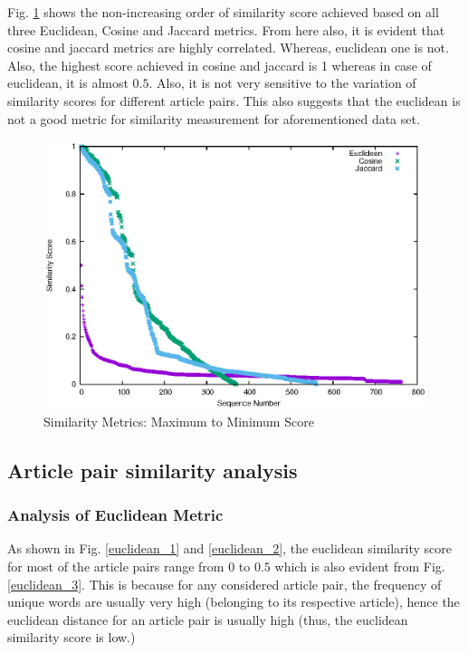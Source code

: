 \documentclass[journal,onecolumn]{IEEEtran}
\begin{document}
 Fig. \ref{usecase1} shows the non-increasing order of similarity score achieved based on all three Euclidean, Cosine and Jaccard metrics. From here also, it is evident that cosine and jaccard metrics are highly correlated. Whereas, euclidean one is not. Also, the highest score achieved in cosine and jaccard is 1 whereas in case of euclidean, it is almost $0.5$. Also, it is not  very sensitive to the variation of similarity scores for different article pairs. This also suggests that the euclidean is not a good metric for similarity measurement for aforementioned data set.
 
  
\begin{figure}[h]
\begin{center}
 \includegraphics[scale=.90] {Plots/similarityUsecase.eps}
 \caption {Similarity Metrics: Maximum to Minimum Score }\label{usecase1}
 \end{center} 
\end{figure}


\subsection{Article pair similarity analysis}


\subsubsection{\textbf{Analysis of Euclidean Metric}}

As shown in Fig. \ref{euclidean_1} and \ref{euclidean_2}, the euclidean similarity score for most of the article pairs range from $0$ to $0.5$ which is also evident from Fig. \ref{euclidean_3}. This is because for any considered article pair, the frequency of unique words are usually very high (belonging to its respective article), hence the euclidean distance for an article pair is usually high (thus, the euclidean similarity score is low.)
\end{document}
